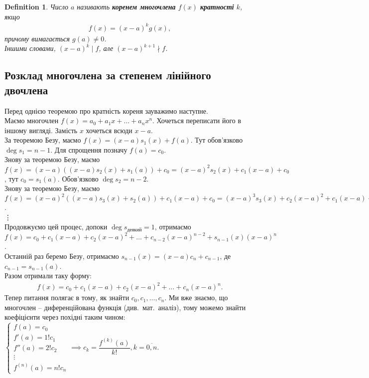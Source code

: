 \documentclass[a4paper, 10pt]{extarticle}
\theoremstyle{theoremdd}
\theoremstyle{theoremdd}
\newtheorem{definition}[theorem]{Definition}
\theoremstyle{theoremdd}
\theoremstyle{theoremdd}
\theoremstyle{theoremdd}
\theoremstyle{theoremdd}
\theoremstyle{theoremdd}
\theoremstyle{theoremdd}
\begin{document}
\begin{definition}
Число $a$ називають \textbf{коренем многочлена} $f(x)$ \textbf{кратності} $k$, якщо 
\begin{align*}
f(x) = (x-a)^k g(x),
\end{align*}
причому вимагається $g(a) \neq 0$.\\
Іншими словами, $(x-a)^k \mid f$, але $(x-a)^{k+1} \nmid f$.
\end{definition}

\subsection{Розклад многочлена за степенем лінійного двочлена}
Перед однією теоремою про кратність кореня зауважимо наступне. \\
Маємо многочлен $f(x) = a_0 + a_1 x + \dots + a_n x^n$. Хочеться переписати його в іншому вигляді. Замість $x$ хочеться всюди $x-a$.\\
За теоремою Безу, маємо $f(x) = (x-a)s_1(x) + f(a)$. Тут обов'язково $\deg s_1 = n-1$. Для спрощення позначу $f(a) = c_0$.\\
Знову за теоремою Безу, маємо $f(x) = (x-a)((x-a)s_2(x) + s_1(a)) + c_0 = (x-a)^2 s_2(x) + c_1 (x-a) + c_0$, тут $c_0 = s_1(a)$. Обов'язково $\deg s_2 = n-2$.\\
Знову за теоремою Безу, маємо $f(x) = (x-a)^2 ((x-a)s_3(x) + s_2(a)) + c_1(x-a) + c_0 = (x-a)^3 s_3(x) + c_2 (x-a)^2 + c_1(x-a) + c_0$.\\
\vdots \\
Продовжуємо цей процес, допоки $\deg s_{\text{деякий}} = 1$, отримаємо\\
$f(x) = c_0 + c_1 (x-a) + c_2 (x-a)^2 + \dots + c_{n-2}(x-a)^{n-2} + s_{n-1}(x) (x-a)^n$.\\
Останній раз беремо Безу, отримаємо $s_{n-1}(x) = (x-a) c_n + c_{n-1}$, де $c_{n-1} = s_{n-1}(a)$.\\
Разом отримали таку форму:
\begin{align*}
f(x) = c_0 + c_1(x-a) + c_2(x-a)^2 + \dots + c_n(x-a)^n.
\end{align*}
Тепер питання полягає в тому, як знайти $c_0,c_1,\dots,c_n$. Ми вже знаємо, що многочлен -- диференційована функція (див.\ мат.\ аналіз), тому можемо знайти коефіцієнти через похідні таким чином:\\
$\begin{cases}
f(a) = c_0\\
f'(a) = 1!c_1\\
f''(a) = 2!c_2\\
\vdots \\
f^{(n)}(a) = n!c_n
\end{cases} \implies c_k = \dfrac{f^{(k)}(a)}{k!}, k = \overline{0,n}$.\\
\end{document}
